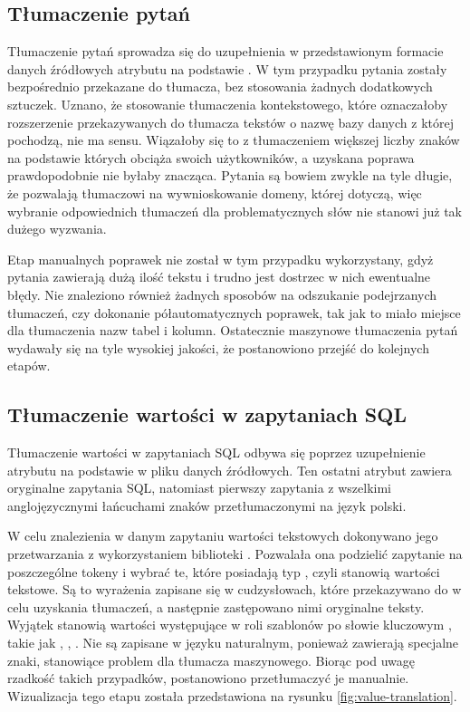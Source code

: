 \subsection{Tłumaczenie pytań}
Tłumaczenie pytań sprowadza się do uzupełnienia w przedstawionym formacie danych źródłowych atrybutu  na podstawie . W tym przypadku pytania zostały bezpośrednio przekazane do tłumacza, bez stosowania żadnych dodatkowych sztuczek. Uznano, że stosowanie tłumaczenia kontekstowego, które oznaczałoby rozszerzenie przekazywanych do tłumacza tekstów o nazwę bazy danych z której pochodzą, nie ma sensu. Wiązałoby się to z tłumaczeniem większej liczby znaków na podstawie których  obciąża swoich użytkowników, a uzyskana poprawa prawdopodobnie nie byłaby znacząca. Pytania są bowiem zwykle na tyle długie, że pozwalają tłumaczowi na wywnioskowanie domeny, której dotyczą, więc wybranie odpowiednich tłumaczeń dla problematycznych słów nie stanowi już tak dużego wyzwania.

Etap manualnych poprawek nie został w tym przypadku wykorzystany, gdyż pytania zawierają dużą ilość tekstu i trudno jest dostrzec w nich ewentualne błędy. Nie znaleziono również żadnych sposobów na odszukanie podejrzanych tłumaczeń, czy dokonanie półautomatycznych poprawek, tak jak to miało miejsce dla tłumaczenia nazw tabel i kolumn. Ostatecznie maszynowe tłumaczenia pytań wydawały się na tyle wysokiej jakości, że postanowiono przejść do kolejnych etapów.

\subsection{Tłumaczenie wartości w zapytaniach SQL}
Tłumaczenie wartości w zapytaniach SQL odbywa się poprzez uzupełnienie atrybutu  na podstawie  w pliku danych źródłowych. Ten ostatni atrybut zawiera oryginalne zapytania SQL, natomiast pierwszy zapytania z wszelkimi anglojęzycznymi łańcuchami znaków przetłumaczonymi na język polski.

W celu znalezienia w danym zapytaniu wartości tekstowych dokonywano jego przetwarzania z wykorzystaniem biblioteki . Pozwalała ona podzielić zapytanie na poszczególne tokeny i wybrać te, które posiadają typ , czyli stanowią wartości tekstowe. Są to wyrażenia zapisane się w cudzysłowach, które przekazywano do  w celu uzyskania tłumaczeń, a następnie zastępowano nimi oryginalne teksty. Wyjątek stanowią wartości występujące w roli szablonów po słowie kluczowym , takie jak , , . Nie są zapisane w języku naturalnym, ponieważ zawierają specjalne znaki, stanowiące problem dla tłumacza maszynowego. Biorąc pod uwagę rzadkość takich przypadków, postanowiono przetłumaczyć je manualnie. Wizualizacja tego etapu została przedstawiona na rysunku \ref{fig:value-translation}.

